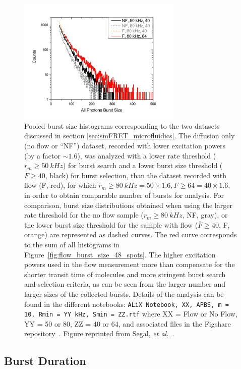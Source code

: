 \begin{figure}
\centering\includegraphics[width=0.7\textwidth]{chapters/figures/pooled_burst_size_distributions.jpg}
\caption{\label{fig:pooled_burst_size_distributions}
Pooled burst size histograms corresponding to the two datasets discussed in section \ref{sec:smFRET_microfluidics}. 
The diffusion only (no flow or \enquote{NF}) dataset, recorded with lower excitation powers (by a factor $\sim1.6$), was analyzed with a lower rate threshold ($r_m \geq 50~kHz$) for burst search and a lower burst size threshold ($\overline{F} \geq 40$, black)
for burst selection, than the dataset recorded with flow (F, red), for which $r_m \geq 80~kHz = 50 \times 1.6, \overline{F} \geq 64 = 40 \times 1.6$, in order to obtain comparable number of bursts for analysis.
For comparison, burst size distributions obtained when using the larger rate threshold for the no flow sample ($r_m \geq 80~kHz$,  NF, gray), or the lower burst size threshold for the sample with flow ($\overline{F} \geq 40$, F, orange) are represented as dashed curves. The red curve corresponds to the sum of all histograms in
Figure~\ref{fig:flow_burst_size_48_spots}.
The higher excitation powers used in the flow measurement more than compensate for the shorter transit time of molecules and more stringent burst search and selection criteria, as can be seen from the larger number and larger sizes of the collected bursts.
Details of the analysis can be found in the different notebooks: \texttt{ALiX Notebook, XX, \ac{APBS}, m = 10, Rmin = YY kHz, Smin = ZZ.rtf} where XX = Flow or No Flow, YY = 50 or 80, ZZ = 40 or 64, and associated files in the Figshare repository~\cite{figshare_repo_2019}. 
Figure reprinted from Segal, \textit{et al.}~\cite{segal_methods_2019}.
}
\end{figure}

\subsection{Burst Duration}
\label{sec:burst_duration_apdx}

